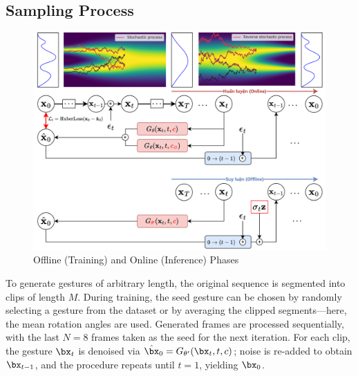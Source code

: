 \subsection{Sampling Process}

\begin{figure}[h]
	\centering
	\includegraphics[width=\linewidth]{images/OnlineAndOffline}
	\caption{Offline (Training) and Online (Inference) Phases}
	\label{fig:OnlineAndOffline}
\end{figure}

To generate gestures of arbitrary length, the original sequence is segmented into clips of length $M$.
During training, the seed gesture can be chosen by randomly selecting a gesture from the dataset or by averaging the clipped segments—here, the mean rotation angles are used.  
Generated frames are processed sequentially, with the last $N=8$ frames taken as the seed for the next iteration.  
For each clip, the gesture $\bx_{t}$ is denoised via $\hat{\bx}_{0} = G_{\theta'}(\bx_{t}, t, c)$; noise is re-added to obtain $\bx_{t-1}$, and the procedure repeats until $t=1$, yielding $\bx_{0}$.

